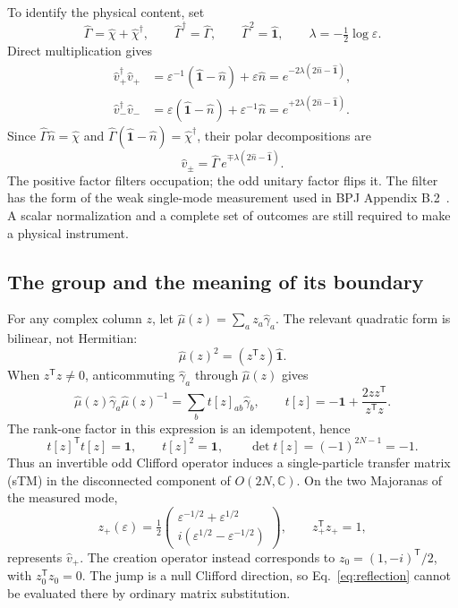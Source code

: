 \documentclass[aps,prb,onecolumn,nofootinbib,superscriptaddress]{revtex4-2}
\newcommand{\One}{\hat{\mathbf{1}}}
\newcommand{\Id}{\mathbf{1}}
\newcommand{\eps}{\varepsilon}
\begin{document}
To identify the physical content, set
\begin{equation}
 \hat\Gamma=\hat\chi+\hat\chi^\dagger,\qquad
 \hat\Gamma^\dagger=\hat\Gamma,\qquad \hat\Gamma^2=\One,\qquad
 \lambda=-\tfrac12\log\eps.
\end{equation}
Direct multiplication gives
\begin{align}
 \hat v_+^\dagger\hat v_+
 &=\eps^{-1}(\One-\hat n)+\eps\hat n
   =e^{-2\lambda(2\hat n-\One)},\nonumber\\
 \hat v_-^\dagger\hat v_-
 &=\eps(\One-\hat n)+\eps^{-1}\hat n
   =e^{+2\lambda(2\hat n-\One)}.
 \label{eq:positive-squares}
\end{align}
Since $\hat\Gamma\hat n=\hat\chi$ and
$\hat\Gamma(\One-\hat n)=\hat\chi^\dagger$, their polar decompositions are
\begin{equation}
 \hat v_\pm=\hat\Gamma\,e^{\mp\lambda(2\hat n-\One)}.
 \label{eq:polar}
\end{equation}
The positive factor filters occupation; the odd unitary factor flips it.
The filter has the form of the weak single-mode measurement used in
BPJ Appendix B.2~\cite{BhuiyanPanJian2026}. A scalar normalization and a
complete set of outcomes are still required to make a physical instrument.

\subsection{The group and the meaning of its boundary}
For any complex column $z$, let
$\hat\mu(z)=\sum_a z_a\hat\gamma_a$. The relevant quadratic form is
bilinear, not Hermitian:
\begin{equation}
 \hat\mu(z)^2=(z^{\mathsf T}z)\One.
\end{equation}
When $z^{\mathsf T}z\ne0$, anticommuting $\hat\gamma_a$ through
$\hat\mu(z)$ gives
\begin{equation}
 \hat\mu(z)\hat\gamma_a\hat\mu(z)^{-1}
 =\sum_b t[z]_{ab}\hat\gamma_b,\qquad
 t[z]=-\Id+\frac{2zz^{\mathsf T}}{z^{\mathsf T}z}.
 \label{eq:reflection}
\end{equation}
The rank-one factor in this expression is an idempotent, hence
\begin{equation}
 t[z]^{\mathsf T}t[z]=\Id,\qquad t[z]^2=\Id,\qquad
 \det t[z]=(-1)^{2N-1}=-1.
 \label{eq:orthogonal}
\end{equation}
Thus an invertible odd Clifford operator induces a single-particle transfer
matrix (sTM) in the disconnected component of $O(2N,\mathbb C)$. On the
two Majoranas of the measured mode,
\begin{equation}
 z_+(\eps)=\tfrac12
 \begin{pmatrix}\eps^{-1/2}+\eps^{1/2}\\
 i(\eps^{1/2}-\eps^{-1/2})\end{pmatrix},\qquad
 z_+^{\mathsf T}z_+=1,
 \label{eq:regulated-z}
\end{equation}
represents $\hat v_+$. The creation operator instead corresponds to
$z_0=(1,-i)^{\mathsf T}/2$, with $z_0^{\mathsf T}z_0=0$. The jump is a
null Clifford direction, so Eq.~\eqref{eq:reflection} cannot be evaluated
there by ordinary matrix substitution.
\end{document}
